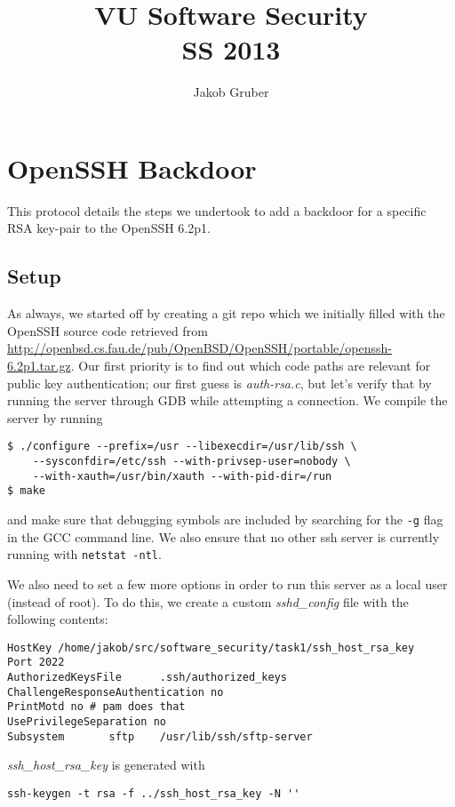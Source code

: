 \documentclass[a4paper,10pt]{article}
\title{VU Software Security \\
       SS 2013}
\author{Jakob Gruber}
\begin{document}
\maketitle

\section{OpenSSH Backdoor}

This protocol details the steps we undertook to add a backdoor for a specific
RSA key-pair to the OpenSSH 6.2p1.

\subsection{Setup}

As always, we started off by creating a git repo which we initially filled with
the OpenSSH source code retrieved from \url{http://openbsd.cs.fau.de/pub/OpenBSD/OpenSSH/portable/openssh-6.2p1.tar.gz}.
Our first priority is to find out which code paths are relevant for
public key authentication; our first guess is \emph{auth-rsa.c}, but let's
verify that by running the server through GDB while attempting a connection.
We compile the server by running

\begin{verbatim}
$ ./configure --prefix=/usr --libexecdir=/usr/lib/ssh \
    --sysconfdir=/etc/ssh --with-privsep-user=nobody \
    --with-xauth=/usr/bin/xauth --with-pid-dir=/run
$ make
\end{verbatim}

and make sure that debugging symbols are included by searching for the \verb|-g|
flag in the GCC command line. We also ensure that no other ssh server is currently
running with \verb|netstat -ntl|.

We also need to set a few more options in order to run this server as a local
user (instead of root). To do this, we create a custom \emph{sshd\_config} file
with the following contents:

\begin{verbatim}
HostKey /home/jakob/src/software_security/task1/ssh_host_rsa_key
Port 2022
AuthorizedKeysFile      .ssh/authorized_keys
ChallengeResponseAuthentication no
PrintMotd no # pam does that
UsePrivilegeSeparation no
Subsystem       sftp    /usr/lib/ssh/sftp-server
\end{verbatim}

\emph{ssh\_host\_rsa\_key} is generated with 

\begin{verbatim}
ssh-keygen -t rsa -f ../ssh_host_rsa_key -N ''
\end{verbatim}
\end{document}
